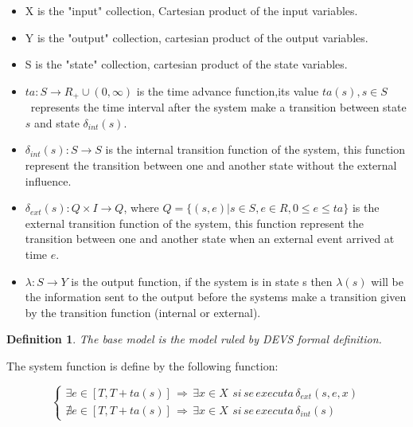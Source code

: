 \documentclass[a4paper,oneside,notitlepage]{article}
\newtheorem{definition}[theorem]{Definition}
\begin{document}
\begin{itemize}
\item X is the "input" collection, Cartesian product of the input variables.

\item Y is the "output" collection, cartesian product of the output
variables.

\item S is the "state" collection, cartesian product of the state variables.

\item $ta:S\rightarrow R_{+}\cup (0,\infty )$ is the time advance
function,its value $ta(s),s\in S$ \ represents the time interval after the
system make a transition between state $s$ and state $\delta _{int}(s)$.

\item $\delta _{int}(s):S\rightarrow S$ is the internal transition function
of the system, this function represent the transition between one and
another state without the external influence.

\item $\delta _{ext}(s):Q\times I\rightarrow Q$, where $Q=\{(s,e)|s\in
S,e\in R,0\leq e\leq ta\}$ is the external transition function of the
system, this function represent the transition between one and another state
when an external event arrived at time $e$.

\item $\lambda :S\rightarrow Y$ is the output function, if the system is in
state s then $\lambda (s)$ will be the information sent to the output before
the systems make a transition given by the transition function (internal or
external).
\end{itemize}

\begin{definition}
The base model is the model ruled by DEVS formal definition.
\end{definition}

The system function is define by the following function:

\begin{equation*}
\left\{ 
\begin{array}{l}
\exists e\in \left[ T,T+ta(s)\right] \,\Rightarrow \,\exists x\in X\,\
si\,se\,executa\,\delta _{ext}(s,e,x) \\ 
\nexists e\in \left[ T,T+ta(s)\right] \,\Rightarrow \,\exists x\in X\,\
si\,se\,executa\,\delta _{int}(s)%
\end{array}%
\right.
\end{equation*}
\end{document}
